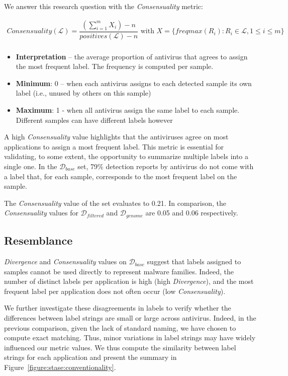We answer this research question with the \emph{Consensuality} metric:

\begin{mdframed}[hidealllines=true,nobreak=true]
\begin{gather*}
	Consensuality(\mathcal{L}) = \dfrac{(\sum_{i=1}^m X_i) - n}{positives(\mathcal{L}) - n} \text{ with }
	X = \{freqmax(R_i) : R_i \in \mathcal{L}, 1 \leq i \leq m\} \\
\end{gather*}

\begin{itemize}
	\item{\textbf{Interpretation}} -- the average proportion of antivirus that agrees to assign the most frequent label. The frequency is computed per sample.
	\item{\textbf{Minimum}}: 0 -- when each antivirus assigns to each detected sample its own label (i.e., unused by others on this sample)
	\item{\textbf{Maximum}}: 1 - when all antivirus assign the same label to each sample. Different samples can have different labels however
\end{itemize}
\end{mdframed}

A high \emph{Consensuality} value highlights that the antiviruses agree on most applications to assign a most frequent label.
This metric is essential for validating, to some extent, the opportunity to summarize multiple labels into a single one.
In the $\mathcal{D}_{base}$ set, 79\% detection reports by antivirus do not come with a label that, for each sample, corresponds to the most frequent label on the sample.

The \emph{Consensuality} value of the set evaluates to 0.21.
In comparison, the \emph{Consensuality} values for $\mathcal{D}_{filtered}$ and $\mathcal{D}_{genome}$ are 0.05 and 0.06 respectively.
\subsection{Resemblance}
\emph{Divergence} and \emph{Consensuality} values on $\mathcal{D}_{base}$ suggest that labels assigned to samples cannot be used directly to represent malware families.
Indeed, the number of distinct labels per application is high (high \emph{Divergence}), and the most frequent label per application does not often occur (low \emph{Consensuality}).

We further investigate these disagreements in labels to verify whether the differences between label strings are small or large across antivirus.
Indeed, in the previous comparison, given the lack of standard naming, we have chosen to compute exact matching.
Thus, minor variations in label strings may have widely influenced our metric values.
We thus compute the similarity between label strings for each application and present the summary in Figure~\ref{figure:stase:conventionality}.

